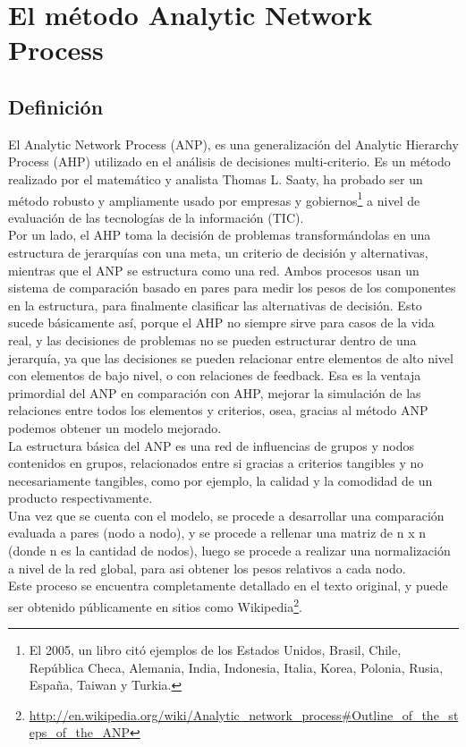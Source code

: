 \documentclass[12pt,twocolumn]{article}
\begin{document}
\section{El método Analytic Network Process}
\subsection{Definición}
El Analytic Network Process (ANP), es una generalización del Analytic
Hierarchy Process (AHP) utilizado en el análisis de decisiones multi-criterio. Es un método realizado por el matemático y analista Thomas L. Saaty, ha probado ser un método robusto y ampliamente usado por empresas y gobiernos\footnote{El 2005, un libro citó ejemplos de los Estados Unidos, Brasil, Chile, República Checa, Alemania, India, Indonesia, Italia, Korea, Polonia, Rusia, España, Taiwan y Turkia.} a nivel de evaluación de las tecnologías de la información (TIC).\\

Por un lado, el AHP toma la decisión de problemas transformándolas en una estructura
de jerarquías con una meta, un criterio de decisión y alternativas, mientras que el ANP se estructura como una red. Ambos procesos usan un sistema de comparación basado en pares para medir los pesos de los componentes en la estructura, para finalmente clasificar las alternativas de decisión. Esto sucede básicamente así, porque el AHP no siempre sirve para casos de la vida real, y las decisiones de problemas no se pueden estructurar dentro de una jerarquía, ya que las decisiones se pueden relacionar entre elementos de alto nivel con elementos de bajo nivel, o con relaciones de feedback. Esa es la ventaja primordial del ANP en comparación con AHP, mejorar la simulación de las relaciones entre todos los elementos y criterios, osea, gracias al método ANP podemos obtener un modelo mejorado.\\

La estructura básica del ANP es una red de influencias de grupos y nodos contenidos en grupos, relacionados entre si gracias a criterios tangibles y no necesariamente tangibles, como por ejemplo, la calidad y la comodidad de un producto respectivamente.\\
\indent Una vez que se cuenta con el modelo, se procede a desarrollar una comparación evaluada a pares (nodo a nodo), y se procede a rellenar una matriz de n x n (donde n es la cantidad de nodos), luego se procede a realizar una normalización a nivel de la red global, para asi obtener los pesos relativos a cada nodo.\\
\indent Este proceso se encuentra completamente detallado en el texto original, y puede ser obtenido públicamente en sitios como Wikipedia\footnote{\url{http://en.wikipedia.org/wiki/Analytic_network_process\#Outline_of_the_steps_of_the_ANP}}.
\newpage
\end{document}
